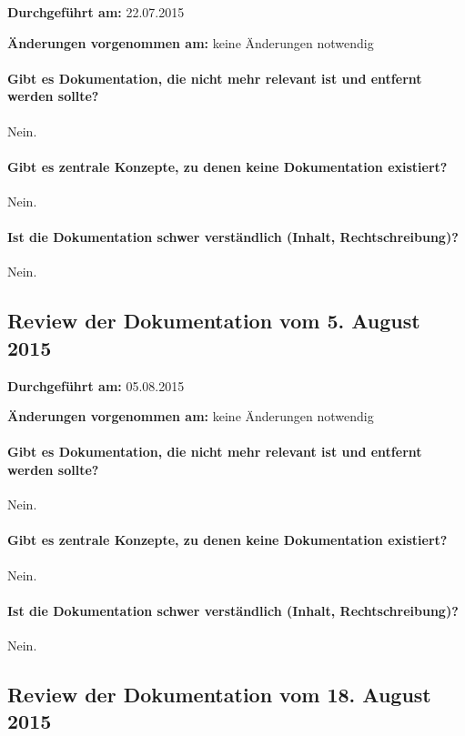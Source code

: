 \textbf{Durchgeführt am:} 22.07.2015

\textbf{Änderungen vorgenommen am:} keine Änderungen notwendig

\paragraph{Gibt es Dokumentation, die nicht mehr relevant ist und entfernt werden sollte?}
Nein.

\paragraph{Gibt es zentrale Konzepte, zu denen keine Dokumentation existiert?}
Nein.

\paragraph{Ist die Dokumentation schwer verständlich (Inhalt, Rechtschreibung)?}
Nein.


\subsection{Review der Dokumentation vom 5. August 2015}

\textbf{Durchgeführt am:} 05.08.2015

\textbf{Änderungen vorgenommen am:} keine Änderungen notwendig

\paragraph{Gibt es Dokumentation, die nicht mehr relevant ist und entfernt werden sollte?}
Nein.

\paragraph{Gibt es zentrale Konzepte, zu denen keine Dokumentation existiert?}
Nein.

\paragraph{Ist die Dokumentation schwer verständlich (Inhalt, Rechtschreibung)?}
Nein.


\subsection{Review der Dokumentation vom 18. August 2015}

